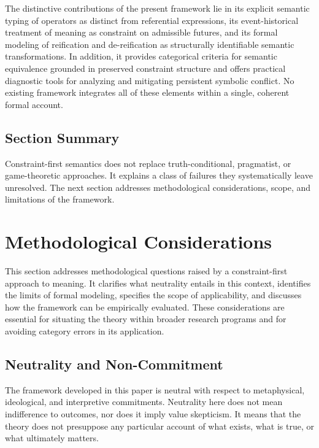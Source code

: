 \documentclass[11pt]{article}
\begin{document}
The distinctive contributions of the present framework lie in its explicit
semantic typing of operators as distinct from referential expressions, its
event-historical treatment of meaning as constraint on admissible futures, and
its formal modeling of reification and de-reification as structurally identifiable
semantic transformations. In addition, it provides categorical criteria for
semantic equivalence grounded in preserved constraint structure and offers
practical diagnostic tools for analyzing and mitigating persistent symbolic
conflict. No existing framework integrates all of these elements within a single,
coherent formal account.

\subsection{Section Summary}

Constraint-first semantics does not replace truth-conditional, pragmatist, or
game-theoretic approaches. It explains a class of failures they systematically
leave unresolved. The next section addresses methodological considerations,
scope, and limitations of the framework.

\section{Methodological Considerations}

This section addresses methodological questions raised by a constraint-first
approach to meaning. It clarifies what neutrality entails in this context,
identifies the limits of formal modeling, specifies the scope of applicability,
and discusses how the framework can be empirically evaluated. These
considerations are essential for situating the theory within broader research
programs and for avoiding category errors in its application.

\subsection{Neutrality and Non-Commitment}

The framework developed in this paper is neutral with respect to metaphysical,
ideological, and interpretive commitments. Neutrality here does not mean
indifference to outcomes, nor does it imply value skepticism. It means that the
theory does not presuppose any particular account of what exists, what is true,
or what ultimately matters.
\end{document}
